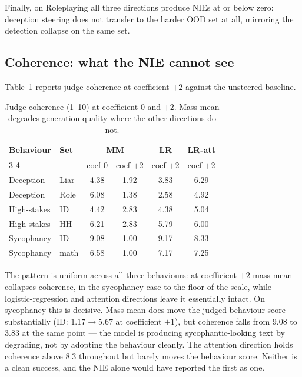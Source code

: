 \documentclass[conference]{IEEEtran}
\begin{document}
Finally, on Roleplaying all three directions produce NIEs at or below zero:
deception steering does not transfer to the harder OOD set at all, mirroring the
detection collapse on the same set.

\subsection{Coherence: what the NIE cannot see}

Table~\ref{tab:coherence} reports judge coherence at coefficient $+2$ against
the unsteered baseline.

\begin{table}[t]
\caption{Judge coherence (1--10) at coefficient $0$ and $+2$. Mass-mean degrades
generation quality where the other directions do not.}
\label{tab:coherence}
\centering
\small
\begin{tabular}{llcccc}
\toprule
Behaviour & Set & \multicolumn{2}{c}{MM} & LR & LR-att \\
\cmidrule(lr){3-4}
& & coef 0 & coef $+2$ & coef $+2$ & coef $+2$ \\
\midrule
Deception   & Liar & 4.38 & 1.92 & 3.83 & 6.29 \\
Deception   & Role & 6.08 & 1.38 & 2.58 & 4.92 \\
High-stakes & ID   & 4.42 & 2.83 & 4.38 & 5.04 \\
High-stakes & HH   & 6.21 & 2.83 & 5.79 & 6.00 \\
Sycophancy  & ID   & 9.08 & 1.00 & 9.17 & 8.33 \\
Sycophancy  & math & 6.58 & 1.00 & 7.17 & 7.25 \\
\bottomrule
\end{tabular}
\end{table}

The pattern is uniform across all three behaviours: at coefficient $+2$
mass-mean collapses coherence, in the sycophancy case to the floor of the scale,
while logistic-regression and attention directions leave it essentially intact.
On sycophancy this is decisive. Mass-mean does move the judged behaviour score
substantially (ID: $1.17 \to 5.67$ at coefficient $+1$), but coherence falls
from 9.08 to 3.83 at the same point --- the model is producing sycophantic-looking
text by degrading, not by adopting the behaviour cleanly. The attention
direction holds coherence above 8.3 throughout but barely moves the behaviour
score. Neither is a clean success, and the NIE alone would have reported the
first as one.
\end{document}
